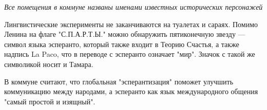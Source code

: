 \emph{Все помещения в коммуне названы именами известных исторических персонажей}

Лингвистические эксперименты не заканчиваются на туалетах и сараях. Помимо
Ленина на флаге "С.П.А.Р.Т.Ы." можно обнаружить пятиконечную звезду --- символ
языка эсперанто, который также входит в Теорию Счастья, а также надпись La
Paco, что в переводе с эсперанто означает "мир". Значок с такой же символикой
носит и Тамара.

В коммуне считают, что глобальная "эсперантизация" поможет улучшить
коммуникацию между народами, а эсперанто как язык международного общения "самый
простой и изящный".

